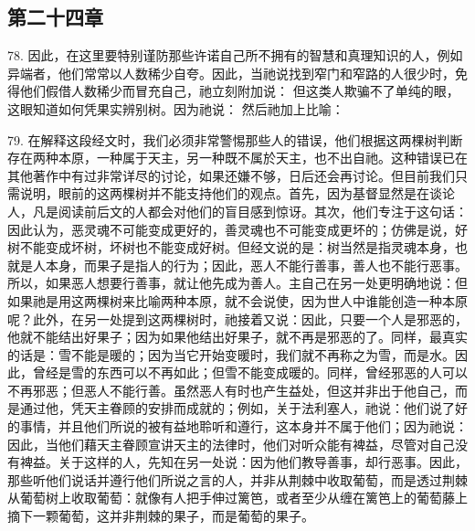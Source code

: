 
\subsection{第二十四章}

78. 因此，在这里要特别谨防那些许诺自己所不拥有的智慧和真理知识的人，例如异端者，他们常常以人数稀少自夸。因此，当祂说找到窄门和窄路的人很少时，免得他们假借人数稀少而冒充自己，祂立刻附加说： 但这类人欺骗不了单纯的眼，这眼知道如何凭果实辨别树。因为祂说： 然后祂加上比喻：\par

79. 在解释这段经文时，我们必须非常警惕那些人的错误，他们根据这两棵树判断存在两种本原，一种属于天主，另一种既不属於天主，也不出自祂。这种错误已在其他著作中有过非常详尽的讨论，如果还嫌不够，日后还会再讨论。但目前我们只需说明，眼前的这两棵树并不能支持他们的观点。首先，因为基督显然是在谈论人，凡是阅读前后文的人都会对他们的盲目感到惊讶。其次，他们专注于这句话：因此认为，恶灵魂不可能变成更好的，善灵魂也不可能变成更坏的；仿佛是说，好树不能变成坏树，坏树也不能变成好树。但经文说的是：树当然是指灵魂本身，也就是人本身，而果子是指人的行为；因此，恶人不能行善事，善人也不能行恶事。所以，如果恶人想要行善事，就让他先成为善人。主自己在另一处更明确地说：但如果祂是用这两棵树来比喻两种本原，就不会说使，因为世人中谁能创造一种本原呢？此外，在另一处提到这两棵树时，祂接着又说：因此，只要一个人是邪恶的，他就不能结出好果子；因为如果他结出好果子，就不再是邪恶的了。同样，最真实的话是：雪不能是暖的；因为当它开始变暖时，我们就不再称之为雪，而是水。因此，曾经是雪的东西可以不再如此；但雪不能变成暖的。同样，曾经邪恶的人可以不再邪恶；但恶人不能行善。虽然恶人有时也产生益处，但这并非出于他自己，而是通过他，凭天主眷顾的安排而成就的；例如，关于法利塞人，祂说：他们说了好的事情，并且他们所说的被有益地聆听和遵行，这本身并不属于他们；因为祂说：因此，当他们藉天主眷顾宣讲天主的法律时，他们对听众能有裨益，尽管对自己没有裨益。关于这样的人，先知在另一处说：因为他们教导善事，却行恶事。因此，那些听他们说话并遵行他们所说之言的人，并非从荆棘中收取葡萄，而是透过荆棘从葡萄树上收取葡萄：就像有人把手伸过篱笆，或者至少从缠在篱笆上的葡萄藤上摘下一颗葡萄，这并非荆棘的果子，而是葡萄的果子。\par

